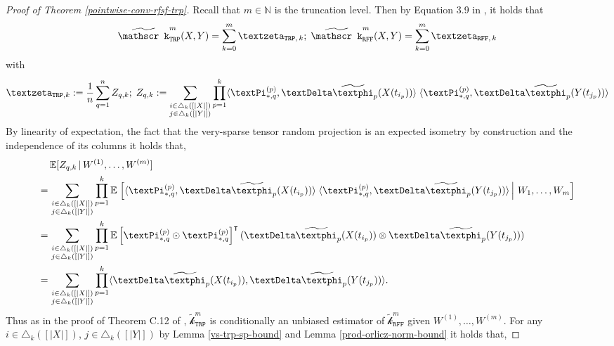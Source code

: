 \documentclass[openany]{book}
\begin{document}
\begin{proof}[Proof of Theorem \ref{pointwise-conv-rfsf-trp}]
        Recall that $m\in \mathbb N$ is the truncation level. Then by Equation 3.9 in \cite{toth2025}, it holds that
        \begin{equation*}
            \widetilde{\mathscr k}_{\mathtt{TRP}}^m(X,Y)=\sum_{k=0}^m \gzeta_{\mathtt{TRP}, \,k};\;\widetilde{\mathscr k}_{\mathtt{RFF}}^m(X,Y)=\sum_{k=0}^m \gzeta_{\mathtt{RFF},\,k}
        \end{equation*}
        with
        \begin{equation*}
            \gzeta_{\mathtt{TRP}, k}:= \frac{1}{n}\sum_{q=1}^nZ_{q,k};\;Z_{q,k}:=\sum_{\substack{i\in \triangle_k([\vert X\vert ])\\ j\in \triangle_k([\vert Y\vert ])}}\prod_{p=1}^k \langle{\gPi_{\ast ,q}^{(p)} },\gDelta\widetilde{\gphi}_p(X(t_{i_p}))\rangle \;\langle{\gPi_{\ast ,q}^{(p)} },\gDelta\widetilde{\gphi}_p(Y(t_{j_p}))\rangle
        \end{equation*}
        By linearity of expectation, the fact that the very-sparse tensor random projection is an expected isometry by construction and the independence of its columns it holds that,
        \begin{equation*}
        \begin{split}
            &\,\mathbb E[Z_{q,k}\,\vert\,W^{(1)},\dots, W^{(m)}]\\=&\,\sum_{\substack{i\in \triangle_k([\vert X\vert ])\\ j\in \triangle_k([\vert Y\vert ])}}\prod_{p=1}^k\mathbb E\left.\left[\langle{\gPi_{\ast ,q}^{(p)} },\gDelta\widetilde{\gphi}_p(X(t_{i_p}))\rangle \;\langle{\gPi_{\ast ,q}^{(p)} },\gDelta\widetilde{\gphi}_p(Y(t_{j_p}))\rangle\,\right\vert\,W_1,\dots,W_m\right]\\=&\,\sum_{\substack{i\in \triangle_k([\vert X\vert ])\\ j\in \triangle_k([\vert Y\vert ])}}\prod_{p=1}^k \mathbb E\left[\gPi_{\ast ,q}^{(p)}\odot \gPi_{\ast ,q}^{(p)}\right]^\intercal(\gDelta\widetilde{\gphi}_p(X(t_{i_p}))\otimes\gDelta\widetilde{\gphi}_p(Y(t_{j_p})))\\=&\,\sum_{\substack{i\in \triangle_k([\vert X\vert ])\\ j\in \triangle_k([\vert Y\vert ])}}\prod_{p=1}^k\langle\gDelta\widetilde{\gphi}_p(X(t_{i_p})),\gDelta\widetilde{\gphi}_p(Y(t_{j_p}))\rangle.
        \end{split}
        \end{equation*}
        Thus as in the proof of Theorem C.12 of \cite{toth2025}, $\widetilde{\mathscr k}_{\mathtt{TRP}}^m$ is conditionally an unbiased estimator of $\widetilde{\mathscr{k}}_{\mathtt{RFF}}^{ m}$ given $W^{(1)},\dots,W^{(m)}$. For any $i\in \triangle_k([\vert X\vert ])$, $j\in \triangle_k([\vert Y\vert ])$ by Lemma \ref{vs-trp-sp-bound} and Lemma \ref{prod-orlicz-norm-bound} it holds that,

\end{proof}
\end{document}
